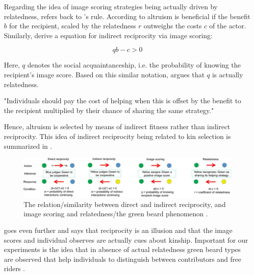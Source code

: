 \documentclass[sigconf]{acmart}
\begin{document}
    Regarding the idea of image scoring strategies being actually driven by relatedness, \citeauthor{roberts_kin_2019} refers back to \citeauthor{hamilton_kin_1964}'s rule.
    According to  altruism is beneficial if the benefit $b$ for the recipient, scaled by the relatedness $r$ outweighs the costs $c$ of the actor.
    Similarly, \citeauthor{nowak_five_2006} \cite{nowak_five_2006} derive a equation for indirect reciprocity via image scoring:

    \begin{equation}
        qb - c > 0\label{eq:qb-c}
    \end{equation}

    Here, $q$ denotes the social acquaintanceship, i.e. the probability of knowing the recipient's image score.
    Based on this similar notation, \cite{roberts_kin_2019} argues that $q$ is actually relatedness.

    "Individuals should pay the cost of helping when this is offset by the benefit to the recipient multiplied by their chance of sharing the same strategy." \cite{roberts_kin_2019}

    Hence, altruism is selected by means of indirect fitness rather than indirect reciprocity.
    This idea of indirect reciprocity being related to kin selection is summarized in .

    \begin{figure}
        \includegraphics[width=\textwidth]{figures/indirect_reciprocity}
        \caption{The relation/similarity between direct and indirect reciprocity, and image scoring and relatedness/the green beard phenomenon \cite{roberts_kin_2019}.}
        \label{fig:indirect_reciprocity}
    \end{figure}

    \citeauthor{roberts_kin_2019} goes even further and says that reciprocity is an illusion and that the image scores and individual observes are actually cues about kinship.
    Important for our experiments is the idea that in absence of actual relatedness green beard types are observed that help individuals to distinguish between contributors and free riders \cite{roberts_kin_2019}.
\end{document}
